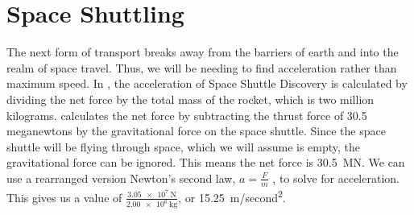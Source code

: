 \section{Space Shuttling}
	The next form of transport breaks away from the barriers of earth and into the realm of space travel. Thus, we will be needing to find acceleration rather than maximum speed. In \cite {rocketAcceleration}, the acceleration of Space Shuttle Discovery is calculated by dividing the net force by the total mass of the rocket, which is two million kilograms. \cite{rocketAcceleration} calculates the net force by subtracting the thrust force of 30.5 meganewtons by the gravitational force on the space shuttle. Since the space shuttle will be flying through space, which we will assume is empty, the gravitational force can be ignored. This means the net force is \SI{30.5}{\MN}. We can use a rearranged version Newton’s second law, $a = \frac{F}{m}$ , to solve for acceleration. This gives us a value of $\frac{\SI{3.05e7}{\newton}}{\SI{2.00e6}{\kg}}$, or \SI{15.25}{\metre/second^2}.

